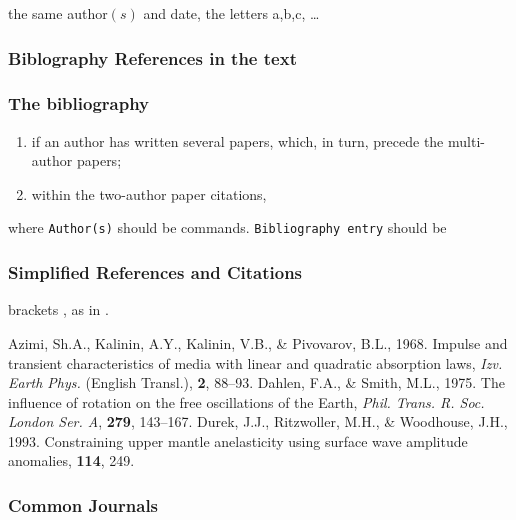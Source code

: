 the same author$(s)$ and date, the letters a,b,c, \ldots\

\subsubsection{Biblography References in the text}

\subsubsection{The bibliography}

\begin{enumerate}
  \item if an author has written several papers,
        which, in turn, precede the multi-author papers;
  \item within the two-author paper citations,
\end{enumerate}
%
where \verb"Author(s)" should be commands. \verb"Bibliography entry" should be

\subsubsection{Simplified References and Citations}

brackets , as in .
\begin{references}
Azimi, Sh.A., Kalinin, A.Y., Kalinin, V.B., \& Pivovarov, B.L., 1968.
Impulse and transient characteristics of media with linear and  quadratic
absorption laws,
\textit{Izv. Earth Phys.} (English Transl.),
\textbf{2}, 88--93.
Dahlen, F.A., \& Smith, M.L., 1975.
The influence of rotation on the free oscillations of the Earth,
\textit{Phil. Trans. R. Soc. London Ser. A}, \textbf{279}, 143--167.
Durek, J.J., Ritzwoller, M.H., \& Woodhouse, J.H., 1993. Constraining upper
mantle anelasticity using surface wave amplitude anomalies, \gji{} \textbf{114},
249.
\end{references}

\subsubsection{Common Journals}

